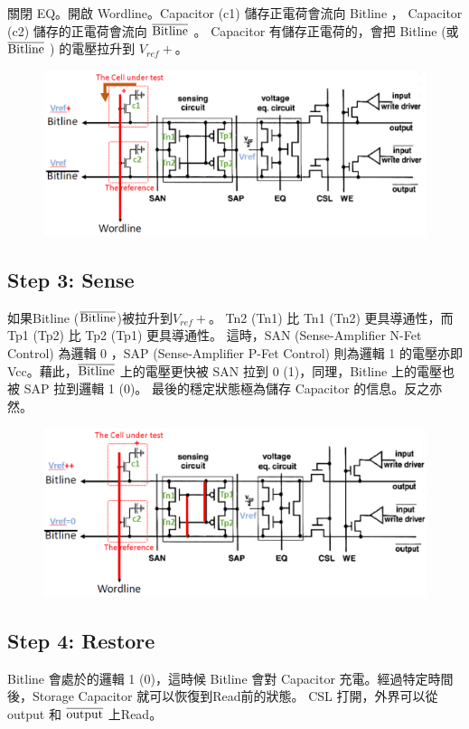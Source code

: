 \documentclass{article}
\begin{document}
關閉 EQ。開啟 Wordline。Capacitor (c1) 儲存正電荷會流向 Bitline ， Capacitor (c2) 儲存的正電荷會流向  $\rm{\overline{Bitline}}$ 。 Capacitor 有儲存正電荷的，會把 Bitline (或 $\rm{\overline{Bitline}}$ ) 的電壓拉升到 $V_{ref}+$。

\begin{figure}[H]
  \centering
  \includegraphics[width = 0.6\linewidth]{./img/2023-11-29-23-27-37.png}
  \end{figure}

\subsection*{Step 3: Sense}

如果Bitline ($\rm\overline{Bitline}$)被拉升到$V_{ref}+$。
Tn2 (Tn1) 比 Tn1 (Tn2) 更具導通性，而 Tp1 (Tp2) 比 Tp2 (Tp1) 更具導通性。
這時，SAN (Sense-Amplifier N-Fet Control) 為邏輯 0 ，SAP (Sense-Amplifier P-Fet Control) 則為邏輯 1 的電壓亦即 Vcc。藉此，$\rm\overline{Bitline}$ 上的電壓更快被 SAN 拉到 0 (1)，同理，Bitline 上的電壓也被 SAP 拉到邏輯 1 (0)。 最後的穩定狀態極為儲存 Capacitor 的信息。反之亦然。

\begin{figure}[H]
  \centering
  \includegraphics[width = 0.6\linewidth]{./img/2023-11-29-23-59-15.png}
  \end{figure}



\subsection*{Step 4: Restore}

Bitline 會處於的邏輯 1 (0)，這時候 Bitline 會對 Capacitor 充電。經過特定時間後，Storage Capacitor 就可以恢復到Read前的狀態。
CSL 打開，外界可以從 output 和 $\rm\overline{output}$ 上Read。
\end{document}

